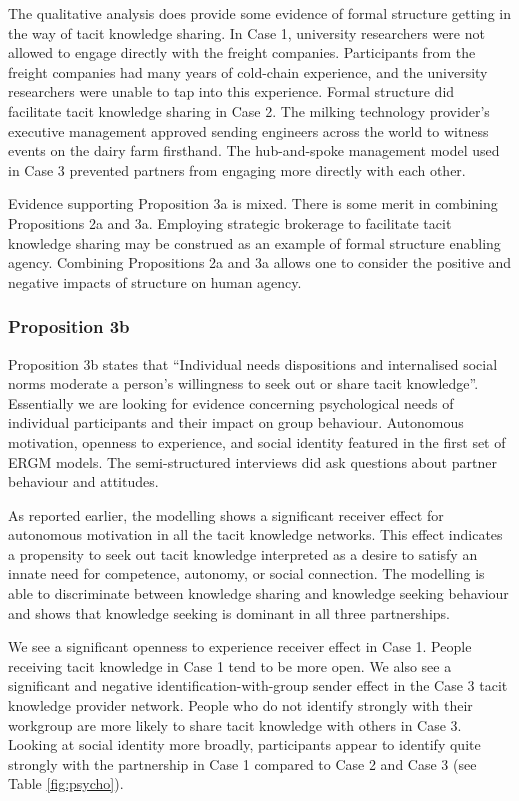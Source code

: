 The qualitative analysis does provide some evidence of formal structure getting in the way of tacit knowledge sharing. In Case 1, university researchers were not allowed to engage directly with the freight companies. Participants from the freight companies had many years of cold-chain experience, and the university researchers were unable to tap into this experience. Formal structure did facilitate tacit knowledge sharing in Case 2. The milking technology provider's executive management approved sending engineers across the world to witness events on the dairy farm firsthand. The hub-and-spoke management model used in Case 3 prevented partners from engaging more directly with each other. \medskip

Evidence supporting Proposition 3a is mixed. There is some merit in combining Propositions 2a and 3a. Employing strategic brokerage to facilitate tacit knowledge sharing may be construed as an example of formal structure enabling agency. Combining Propositions 2a and 3a allows one to consider the positive and negative impacts of structure on human agency. 

\subsubsection{Proposition 3b}

Proposition 3b states that \enquote{Individual needs dispositions and internalised social norms moderate a person's willingness to seek out or share tacit knowledge}. Essentially we are looking for evidence concerning psychological needs of individual participants and their impact on group behaviour. Autonomous motivation, openness to experience, and social identity featured in the first set of ERGM models. The semi-structured interviews did ask questions about partner behaviour and attitudes. \medskip 

As reported earlier, the modelling shows a significant receiver effect for autonomous motivation in all the tacit knowledge networks. This effect indicates a propensity to seek out tacit knowledge interpreted as a desire to satisfy an innate need for competence, autonomy, or social connection. The modelling is able to discriminate between knowledge sharing and knowledge seeking behaviour and shows that knowledge seeking is dominant in all three partnerships. \medskip

We see a significant openness to experience receiver effect in Case 1. People receiving tacit knowledge in Case 1 tend to be more open. We also see a significant and negative identification-with-group sender effect in the Case 3 tacit knowledge provider network. People who do not identify strongly with their workgroup are more likely to share tacit knowledge with others in Case 3. Looking at social identity more broadly, participants appear to identify quite strongly with the partnership in Case 1 compared to Case 2 and Case 3 (see Table \ref{fig:psycho}). \medskip

